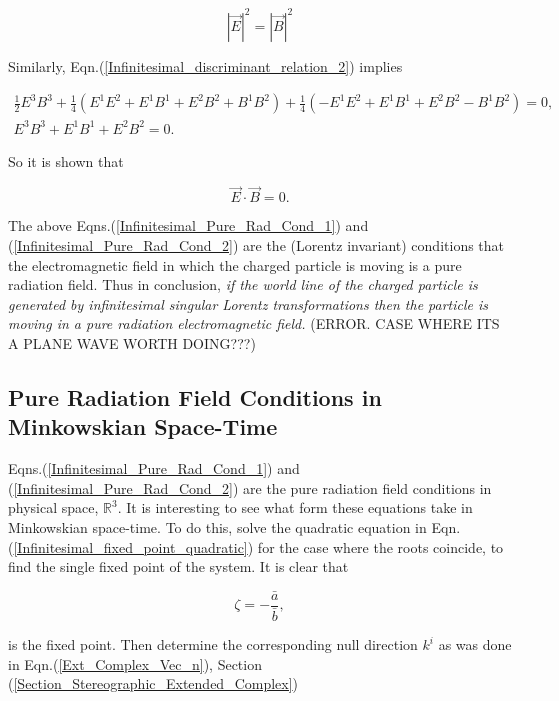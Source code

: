\begin{equation}\label{Infinitesimal_Pure_Rad_Cond_1}
{|\vec{E}|}^2 = {|\vec{B}|}^2
\end{equation}

\noindent Similarly, Eqn.(\ref{Infinitesimal_discriminant_relation_2}) implies

\begin{gather*}
\frac{1}{2} E^3 B^3 + \frac{1}{4} (E^1E^2 + E^1B^1 + E^2B^2 + B^1B^2) + \frac{1}{4} (-E^1E^2 + E^1B^1 + E^2B^2 - B^1B^2) = 0, \\
E^3B^3 + E^1B^1 + E^2B^2 = 0.
\end{gather*}

\noindent So it is shown that

\begin{equation}\label{Infinitesimal_Pure_Rad_Cond_2}
\vec{E} \cdot \vec{B} = 0.
\end{equation}

\noindent The above Eqns.(\ref{Infinitesimal_Pure_Rad_Cond_1}) and (\ref{Infinitesimal_Pure_Rad_Cond_2}) are the (Lorentz invariant) conditions that the electromagnetic field in which the charged particle is moving is a pure radiation field. Thus in conclusion, \textit{if the world line of the charged particle is generated by infinitesimal singular Lorentz transformations then the particle is moving in a pure radiation electromagnetic field.} (ERROR. CASE WHERE ITS A PLANE WAVE WORTH DOING???)

\subsection{Pure Radiation Field Conditions in Minkowskian Space-Time}

Eqns.(\ref{Infinitesimal_Pure_Rad_Cond_1}) and (\ref{Infinitesimal_Pure_Rad_Cond_2}) are the pure radiation field conditions in physical space, ${\mathbb{R}}^3$. It is interesting to see what form these equations take in Minkowskian space-time. To do this, solve the quadratic equation in Eqn.(\ref{Infinitesimal_fixed_point_quadratic}) for the case where the roots coincide, to find the single fixed point of the system. It is clear that 

\begin{equation}\label{Infinitesimal_Zeta_Fixed_Point}
\zeta = - \frac{\bar{a}}{\bar{b}},
\end{equation}

\noindent is the fixed point. Then determine the corresponding null direction $k^i$ as was done in Eqn.(\ref{Ext_Complex_Vec_n}), Section (\ref{Section_Stereographic_Extended_Complex})

